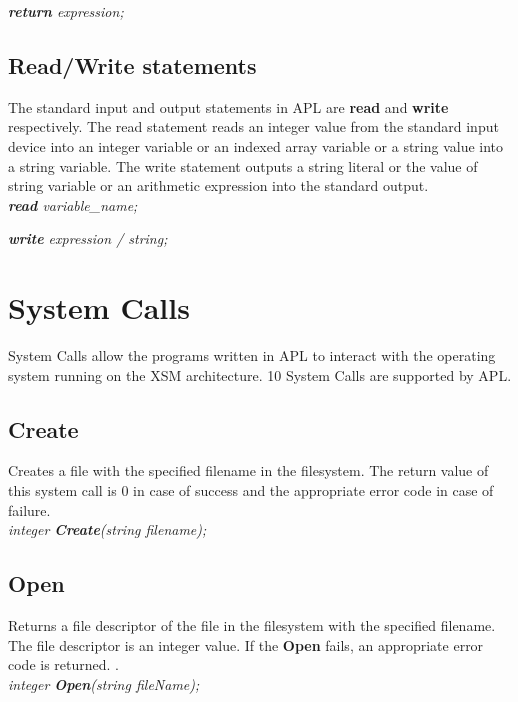 \documentclass[11pt]{article}
\begin{document}
\textit{\textbf{return} expression;}


\subsection{Read/Write statements}
The standard input and output statements in APL are \textbf{read} and \textbf{write} respectively. The read statement reads an integer value from the standard input device into an integer variable or an indexed array variable or a string value into a string variable. The write statement outputs a string literal or the value of string variable or an arithmetic expression  into the standard output.\\

\textit{\textbf{read} variable\_name;}

\textit{\textbf{write} expression / string;}






\section{System Calls}

System Calls allow the programs written in APL to interact with the operating system running on the XSM architecture. 10 System Calls are supported by APL. 




\subsection{Create}
Creates a file with the specified filename in the filesystem. The return value of this system call is 0 in case of success and the appropriate error code in case of failure.
\\

\textit{integer \textbf{Create}(string filename);}






\subsection{Open}
Returns a file descriptor of the file in the filesystem with the specified filename. The file descriptor is an integer value. If the \textbf{Open} fails, an appropriate error code is returned.
.\\

\textit{integer \textbf{Open}(string fileName);}
\end{document}
